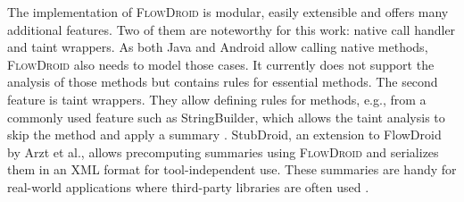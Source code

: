 \documentclass[../draft.tex]{subfiles}
\begin{document}
    The implementation of \textsc{FlowDroid} is modular, easily extensible and offers many additional features. 
    Two of them are noteworthy for this work: native call handler and taint wrappers. 
    As both Java and Android allow calling native methods, \textsc{FlowDroid} also needs to model those cases. 
    It currently does not support the analysis of those methods but contains rules for essential methods. 
    The second feature is taint wrappers. 
    They allow defining rules for methods, e.g., from a commonly used feature such as StringBuilder, which allows the taint analysis to skip the method and apply a summary \cite{Arzt2014}. 
    StubDroid, an extension to FlowDroid by Arzt et al., allows precomputing summaries using \textsc{FlowDroid} and serializes them in an XML format for tool-independent use. 
    These summaries are handy for real-world applications where third-party libraries are often used \cite{Arzt2016}.
\end{document}
